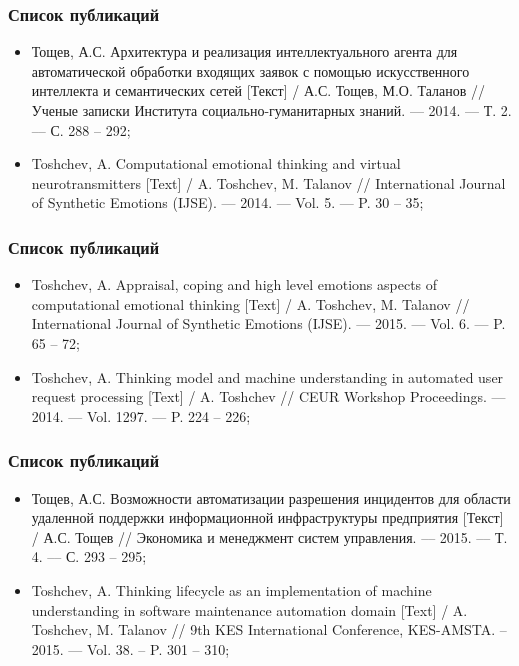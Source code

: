 \documentclass[14pt]{beamer}
\begin{document}
\begin{frame}
\frametitle{Список публикаций}

\begin{itemize}
	\item Тощев, А.С. Архитектура и реализация интеллектуального агента для автоматической обработки входящих заявок с помощью искусственного интеллекта и семантических сетей [Текст] / А.С. Тощев, М.О. Таланов // Ученые записки Института социально-гуманитарных знаний. –– 2014. –– Т. 2. –– С. 288 – 292; 
	\item Toshchev, A. Computational emotional thinking and virtual neurotransmitters [Text] / A. Toshchev, M. Talanov // International Journal of Synthetic Emotions (IJSE). — 2014. — Vol. 5. — P. 30 – 35;
	
\end{itemize}
\end{frame}


\begin{frame}
\frametitle{Список публикаций}

\begin{itemize}
	\item Toshchev, A. Appraisal, coping and high level emotions aspects of computational emotional thinking [Text] / A. Toshchev, M. Talanov // International Journal of Synthetic Emotions (IJSE). — 2015. — Vol. 6. — P. 65 – 72; 
	\item Toshchev, A. Thinking model and machine understanding in automated user request processing [Text] / A. Toshchev // CEUR Workshop Proceedings. — 2014. — Vol. 1297. — P. 224 – 226;
\end{itemize}
\end{frame}


\begin{frame}
\frametitle{Список публикаций}

\begin{itemize}
	\item Тощев, А.С. Возможности автоматизации разрешения инцидентов для области удаленной поддержки информационной инфраструктуры предприятия [Текст] / А.С. Тощев // Экономика и менеджмент систем управления. –– 2015. –– Т. 4. –– С. 293 – 295;
	\item Toshchev, A. Thinking lifecycle as an implementation of machine understanding in software maintenance automation domain [Text] / A. Toshchev, M. Talanov // 9th KES International Conference, KES-AMSTA. -- 2015. — Vol. 38. -- P. 301 – 310;
\end{itemize}
\end{frame}
\end{document}
